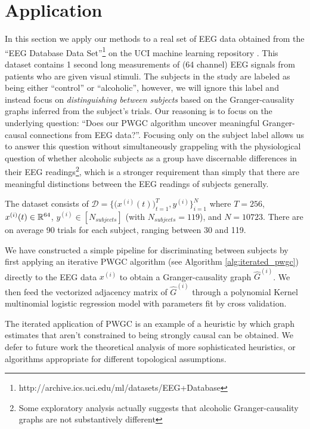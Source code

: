\documentclass[12pt]{article}
\begin{document}
\section{Application}
\label{sec:application}
In this section we apply our methods to a real set of EEG data
obtained from the ``EEG Database Data
Set''\footnote{http://archive.ics.uci.edu/ml/datasets/EEG+Database}
\cite{zhang1995event} on the UCI machine learning repository
\cite{uci_mlr}.  This dataset contains 1 second long measurements of
(64 channel) EEG signals from patients who are given visual stimuli.
The subjects in the study are labeled as being either ``control'' or
``alcoholic'', however, we will ignore this label and instead focus on
\textit{distinguishing between subjects} based on the
Granger-causality graphs inferred from the subject's trials.  Our
reasoning is to focus on the underlying question: ``Does our PWGC
algorithm uncover meaningful Granger-causal connections from EEG
data?''.  Focusing only on the subject label allows us to answer this
question without simultaneously grappeling with the physiological
question of whether alcoholic subjects as a group have discernable
differences in their EEG readings\footnote{Some exploratory analysis
  actually suggests that alcoholic Granger-causality graphs are not
  substantively different}, which is a stronger requirement than
simply that there are meaningful distinctions between the EEG readings
of subjects generally.

The dataset consists of
$\mathcal{D} = \{\big(x^{(i)}(t)\big)_{t = 1}^T, y^{(i)} \}_{i = 1}^N$
where $T = 256$, $x^{(i)}(t) \in \mathbb{R}^{64}$,
$y^{(i)} \in [N_{subjects}]$ (with $N_{subjects} = 119$), and
$N = 10723$.  There are on average 90 trials for each subject,
ranging between 30 and 119.

We have constructed a simple pipeline for discriminating between
subjects by first applying an iterative PWGC algorithm (see Algorithm
\ref{alg:iterated_pwgc}) directly to the EEG data $x^{(i)}$ to obtain
a Granger-causality graph $\widehat{G}^{(i)}$.  We then feed the
vectorized adjacency matrix of $\widehat{G}^{(i)}$ through a
polynomial Kernel multinomial logistic regression model with
parameters fit by cross validation.

\begin{remark}
  The iterated application of PWGC is an example of a heuristic by
  which graph estimates that aren't constrained to being strongly
  causal can be obtained.  We defer to future work the theoretical
  analysis of more sophisticated heuristics, or algorithms appropriate
  for different topological assumptions.
\end{remark}
\end{document}
